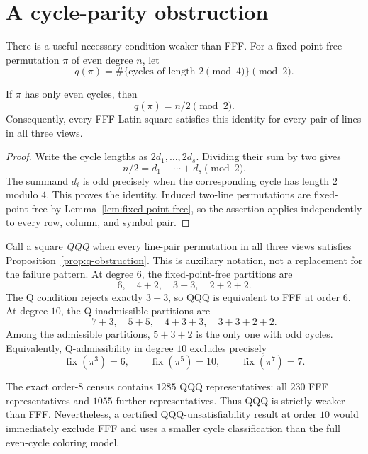 \section{A cycle-parity obstruction}

There is a useful necessary condition weaker than FFF.  For a
fixed-point-free permutation $\pi$ of even degree $n$, let
\[
 q(\pi)=\#\{\text{cycles of length }2\pmod 4\}\pmod 2.
\]

\begin{proposition}
\label{prop:q-obstruction}
If $\pi$ has only even cycles, then
\[
 q(\pi)=n/2\pmod 2.
\]
Consequently, every FFF Latin square satisfies this identity for every pair
of lines in all three views.
\end{proposition}

\begin{proof}
Write the cycle lengths as $2d_1,\ldots,2d_s$.  Dividing their sum by two
gives
\[
 n/2=d_1+\cdots+d_s\pmod 2.
\]
The summand $d_i$ is odd precisely when the corresponding cycle has length
$2$ modulo $4$.  This proves the identity.  Induced two-line permutations
are fixed-point-free by Lemma~\ref{lem:fixed-point-free}, so the assertion
applies independently to every row, column, and symbol pair.
\end{proof}

Call a square \emph{QQQ} when every line-pair permutation in all three views
satisfies Proposition~\ref{prop:q-obstruction}.  This is auxiliary notation,
not a replacement for the failure pattern.  At degree $6$, the
fixed-point-free partitions are
\[
 6,\quad4+2,\quad3+3,\quad2+2+2.
\]
The Q condition rejects exactly $3+3$, so QQQ is equivalent to FFF at order
$6$.  At degree $10$, the Q-inadmissible partitions are
\[
 7+3,\quad5+5,\quad4+3+3,\quad3+3+2+2.
\]
Among the admissible partitions, $5+3+2$ is the only one with odd cycles.
Equivalently, Q-admissibility in degree $10$ excludes precisely
\[
 \operatorname{fix}(\pi^3)=6,\qquad
 \operatorname{fix}(\pi^5)=10,\qquad
 \operatorname{fix}(\pi^7)=7.
\]

The exact order-$8$ census contains $1285$ QQQ representatives: all $230$
FFF representatives and $1055$ further representatives.  Thus QQQ is
strictly weaker than FFF.  Nevertheless, a certified QQQ-unsatisfiability
result at order $10$ would immediately exclude FFF and uses a smaller cycle
classification than the full even-cycle coloring model.
